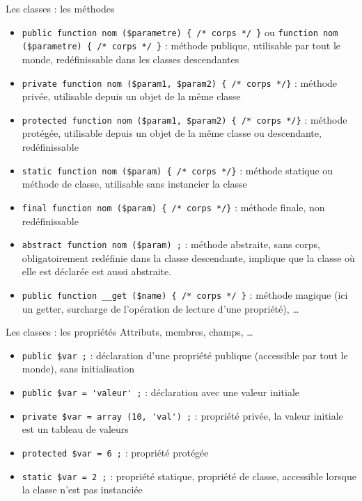 \begin{frame}[containsverbatim]{Les classes : les méthodes}
	\begin{itemize}
		\item \lstinline!public function nom ($parametre) { /* corps */ }! ou \lstinline!function nom ($parametre) { /* corps */ }! : méthode publique, utilisable par tout le monde, redéfinissable dans les classes descendantes
		\item \lstinline!private function nom ($param1, $param2) { /* corps */}! : méthode privée, utilisable depuis un objet de la même classe
		\item \lstinline!protected function nom ($param1, $param2) { /* corps */}! : méthode protégée, utilisable depuis un objet de la même classe ou descendante, redéfinissable
		\item \lstinline!static function nom ($param) { /* corps */}! : méthode statique ou méthode de classe, utilisable sans instancier la classe
		\item \lstinline!final function nom ($param) { /* corps */}! : méthode finale, non redéfinissable
		\item \lstinline!abstract function nom ($param) ;! : méthode abstraite, sans corps, obligatoirement redéfinie dans la classe descendante, implique que la classe où elle est déclarée est aussi abstraite.
		\item \lstinline!public function __get ($name) { /* corps */ }! : méthode magique (ici un getter, surcharge de l'opération de lecture d'une propriété), \ldots
	\end{itemize}
\end{frame}

\begin{frame}[containsverbatim]{Les classes : les propriétés}
	Attributs, membres, champs, \ldots
	\begin{itemize}
		\item \lstinline!public $var ;! : déclaration d'une propriété publique (accessible par tout le monde), sans initialisation
		\item \lstinline!public $var = 'valeur' ;! : déclaration avec une valeur initiale
		\item \lstinline!private $var = array (10, 'val') ;! : propriété privée, la valeur initiale est un tableau de valeurs
		\item \lstinline!protected $var = 6 ;! : propriété protégée
		\item \lstinline!static $var = 2 ;! : propriété statique, propriété de classe, accessible lorsque la classe n'est pas instanciée
	\end{itemize}
\end{frame}

